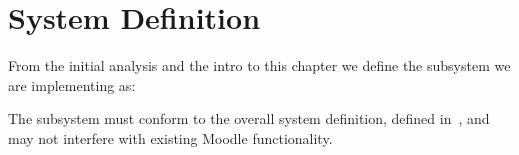 \section{System Definition}
\label{sec:subSysDef}
From the initial analysis and the intro to this chapter we define the subsystem we are implementing as: 
\begin{center}
\end{center}
The subsystem must conform to the overall system definition, defined in~, and may not interfere with existing Moodle functionality.